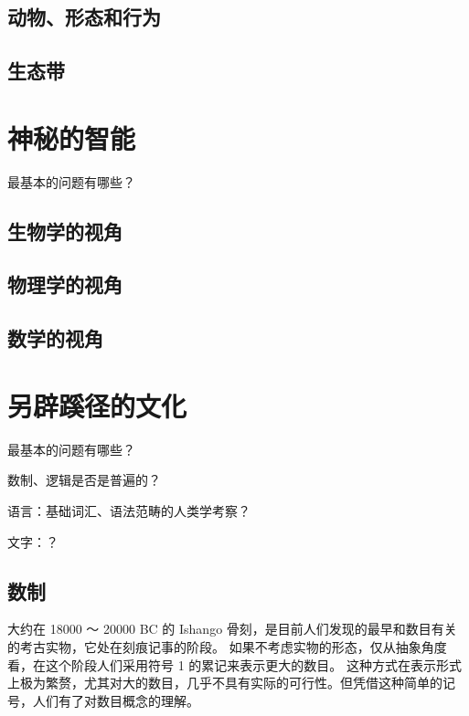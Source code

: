 \documentclass[a4paper,10.5pt]{book}
\begin{document}
\section{动物、形态和行为}

\section{生态带}



\chapter{神秘的智能}

最基本的问题有哪些？

\section{生物学的视角}

\section{物理学的视角}

\section{数学的视角}



\chapter{另辟蹊径的文化}

最基本的问题有哪些？

数制、逻辑是否是普遍的？

语言：基础词汇、语法范畴的人类学考察？

文字：？

\section{数制}

大约在 18000 ～ 20000 BC 的 Ishango 骨刻，是目前人们发现的最早和数目有关的考古实物，它处在刻痕记事的阶段。
如果不考虑实物的形态，仅从抽象角度看，在这个阶段人们采用符号 1 的累记来表示更大的数目。
这种方式在表示形式上极为繁赘，尤其对大的数目，几乎不具有实际的可行性。但凭借这种简单的记号，人们有了对数目概念的理解。
\end{document}
